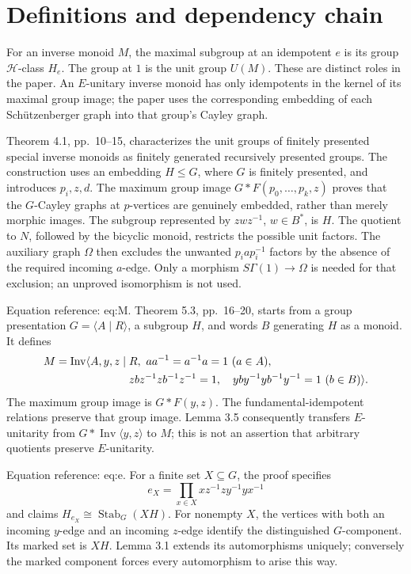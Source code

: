 \documentclass[10pt]{article}
\begin{document}
\section*{Definitions and dependency chain}
For an inverse monoid \(M\), the maximal subgroup at an idempotent \(e\) is its group \(\mathcal H\)-class \(H_e\). The group at \(1\) is the unit group \(U(M)\). These are distinct roles in the paper. An \(E\)-unitary inverse monoid has only idempotents in the kernel of its maximal group image; the paper uses the corresponding embedding of each Schützenberger graph into that group’s Cayley graph.\par
Theorem 4.1, pp. 10–15, characterizes the unit groups of finitely presented special inverse monoids as finitely generated recursively presented groups. The construction uses an embedding \(H\le G\), where \(G\) is finitely presented, and introduces \(p_i,z,d\). The maximum group image \(G*F(p_0,\ldots,p_k,z)\) proves that the \(G\)-Cayley graphs at \(p\)-vertices are genuinely embedded, rather than merely morphic images. The subgroup represented by \(zwz^{-1}\), \(w\in B^*\), is \(H\). The quotient to \(N\), followed by the bicyclic monoid, restricts the possible unit factors. The auxiliary graph \(\Omega\) then excludes the unwanted \(p_iap_i^{-1}\) factors by the absence of the required incoming \(a\)-edge. Only a morphism \(S\Gamma(1)\to\Omega\) is needed for that exclusion; an unproved isomorphism is not used.\par
Equation reference: eq:M. Theorem 5.3, pp. 16–20, starts from a group presentation \(G=\langle A\mid R\rangle\), a subgroup \(H\), and words \(B\) generating \(H\) as a monoid. It defines \[\begin{aligned}
 M=\operatorname{Inv}\langle A,y,z\mid {}&
 R,\ aa^{-1}=a^{-1}a=1\ (a\in A), \notag\\
 &zbz^{-1}zb^{-1}z^{-1}=1,\quad
 yby^{-1}yb^{-1}y^{-1}=1\ (b\in B)\rangle .
 \end{aligned}\] The maximum group image is \(G*F(y,z)\). The fundamental-idempotent relations preserve that group image. Lemma 3.5 consequently transfers \(E\)-unitarity from \(G*\operatorname{Inv}\langle y,z\rangle\) to \(M\); this is not an assertion that arbitrary quotients preserve \(E\)-unitarity.\par
Equation reference: eq:e. For a finite set \(X\subseteq G\), the proof specifies \[
 e_X=\prod_{x\in X}xz^{-1}zy^{-1}yx^{-1}\] and claims \(H_{e_X}\cong\operatorname{Stab}_G(XH)\). For nonempty \(X\), the vertices with both an incoming \(y\)-edge and an incoming \(z\)-edge identify the distinguished \(G\)-component. Its marked set is \(XH\). Lemma 3.1 extends its automorphisms uniquely; conversely the marked component forces every automorphism to arise this way.\par
\end{document}

